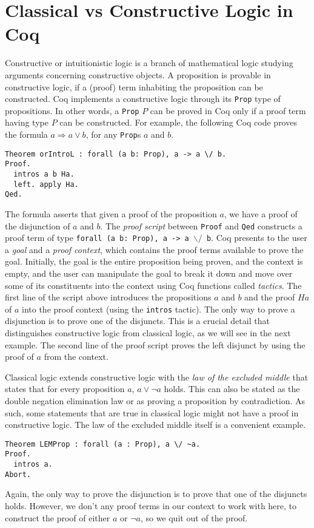 \documentclass{article}
\begin{document}
	\section{Classical vs Constructive Logic in Coq}
	\label{sec:logic}
	Constructive or intuitionistic logic 
	is a branch of mathematical logic 
	studying arguments concerning 
	constructive objects. A proposition 
	is provable in constructive logic, if 
	a (proof) term inhabiting the 
	proposition can be constructed. 
	Coq implements a constructive 
	logic through its \texttt{Prop}
	type of propositions. In other words,
	a \texttt{Prop} $P$ can be proved in 
	Coq only if a proof term having 
	type $P$ can be constructed.
	For example, the following Coq
	code proves the formula
	$a \Rightarrow a \lor b$, for any 
	\texttt{Prop}s $a$ and $b$.
	\begin{verbatim}
Theorem orIntroL : forall (a b: Prop), a -> a \/ b.
Proof.
  intros a b Ha.
  left. apply Ha.
Qed.
	\end{verbatim}
	The formula asserts that given a 
	proof of the proposition $a$, we
	have a proof of the 
	disjunction of $a$ and $b$. The 
	\textit{proof script} between 
	\texttt{Proof} 
	and \texttt{Qed} constructs a 
	proof term of type \texttt{forall 
	(a b: Prop), a -> a $\backslash/$ b}. 
	Coq presents to the user a 
	\textit{goal} and a \textit{proof 
	context}, which contains the proof 
	terms available to prove the goal.
	Initially, the goal is the entire 
	proposition being proven, and the 
	context is empty, and the user
	can manipulate the goal to break 
	it down and move over some of its 
	constituents into the context
	using Coq functions called 
	\textit{tactics}. The first line of the 
	script above introduces 
	the propositions $a$ and $b$ and the 
	proof $Ha$ of $a$ into the 
	proof context (using the \texttt{intros}
	tactic). The only way to prove a 
	disjunction is to prove one 
	of the disjuncts. This is a crucial
	detail that distinguishes constructive
	logic from classical logic, as we 
	will see in the next example. 
	The second line of the proof script 
	proves the left disjunct by using 
	the proof of $a$ from the context.
	
	Classical logic extends 
	constructive logic with the 
	\textit{law of the excluded 
	middle} that states that for 
	every proposition $a$, 
	$a \lor \neg a$ holds. This can 
	also be stated as the 
	double negation elimination 
	law or as proving a 
	proposition by contradiction. As
	such, some statements that are true 
	in classical logic might not have 
	a proof in constructive logic.
	The law of the excluded middle
	itself is a convenient example.
	\begin{verbatim}
Theorem LEMProp : forall (a : Prop), a \/ ~a.
Proof.
  intros a. 
Abort.
	\end{verbatim}
	Again, the only way to prove the 
	disjunction is to prove that one 
	of the disjuncts holds. However, 
	we don't any proof terms in our
	context to work 
	with here, to construct the 
	proof of either $a$ or $\neg a$,
	so we quit out of the proof.
	
\end{document}
